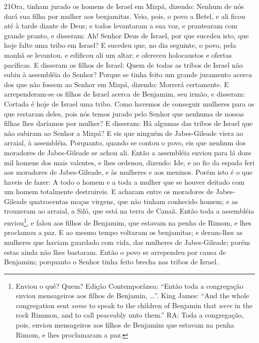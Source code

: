 \lettrine{21} Ora, tinham jurado os homens de Israel em Mizpá,
dizendo: Nenhum de nós dará sua filha por mulher aos benjamitas.
Veio, pois, o povo a Betel, e ali ficou até à tarde diante de
Deus; e todos levantaram a sua voz, e prantearam com grande pranto,
e disseram: Ah! Senhor Deus de Israel, por que sucedeu isto, que
hoje falte uma tribo em Israel? E sucedeu que, no dia seguinte,
o povo, pela manhã se levantou, e edificou ali um altar; e ofereceu
holocaustos e ofertas pacíficas. E disseram os filhos de Israel:
Quem de todas as tribos de Israel não subiu à assembléia do Senhor?
Porque se tinha feito um grande juramento acerca dos que não fossem
ao Senhor em Mizpá, dizendo: Morrerá certamente. E
arrependeram-se os filhos de Israel acerca de Benjamim, seu irmão, e
disseram: Cortada é hoje de Israel uma tribo. Como havemos de
conseguir mulheres para os que restaram deles, pois nós temos jurado
pelo Senhor que nenhuma de nossas filhas lhes daríamos por mulher?
E disseram: Há algumas das tribos de Israel que não subiram ao
Senhor a Mizpá? E eis que ninguém de Jabes-Gileade viera ao arraial,
à assembléia. Porquanto, quando se contou o povo, eis que nenhum
dos moradores de Jabes-Gileade se achou ali. Então a
assembléia enviou para lá doze mil homens dos mais valentes, e lhes
ordenou, dizendo: Ide, e ao fio da espada feri aos moradores de
Jabes-Gileade, e às mulheres e aos meninos. Porém isto é o
que haveis de fazer: A todo o homem e a toda a mulher que se houver
deitado com um homem totalmente destruireis. E acharam entre
os moradores de Jabes-Gileade quatrocentas moças virgens, que não
tinham conhecido homem; e as trouxeram ao arraial, a Siló, que está
na terra de Canaã. Então toda a assembléia
enviou\footnote{Enviou o quê? Quem? Edição Contemporânea: ``Então
toda a congregação enviou mensageiros aos filhos de Benjamin,
\ldots''. King James: ``And the whole congregation sent \emph{some}
to speak to the children of Benjamin that \emph{were} in the rock
Rimmon, and to call peaceably unto them.'' RA: Toda a congregação,
pois, enviou mensageiros aos filhos de Benjamim que estavam na penha
Rimom, e lhes proclamaram a paz.}, e falou aos filhos de Benjamim,
que estavam na penha de Rimom, e lhes proclamou a paz. E ao
mesmo tempo voltaram os benjamitas; e deram-lhes as mulheres que
haviam guardado com vida, das mulheres de Jabes-Gileade; porém estas
ainda não lhes bastaram. Então o povo se arrependeu por causa
de Benjamim; porquanto o Senhor tinha feito brecha nas tribos de
Israel.


